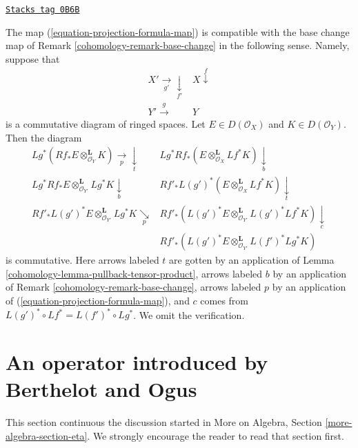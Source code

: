 \begin{remark}
\label{cohomology-remark-compatible-with-diagram}
\href{https://stacks.math.columbia.edu/tag/0B6B}{\texttt{Stacks tag 0B6B}}

The map (\ref{equation-projection-formula-map}) is compatible with the
base change map of Remark \ref{cohomology-remark-base-change} in the following sense.
Namely, suppose that
$$
\begin{array}{cc}X' \underset{g'}{\longrightarrow}\underset{f'}{\downarrow} & X \overset{f}{\downarrow} \\ Y' \overset{g}{\longrightarrow} & Y\end{array}
$$
is a commutative diagram of ringed spaces.
Let $E \in D(\mathcal{O}_X)$ and $K \in D(\mathcal{O}_Y)$.
Then the diagram
$$
\begin{array}{cc}Lg^*(Rf_*E \otimes^\mathbf{L}_{\mathcal{O}_Y} K) \underset{p}{\longrightarrow}\underset{t}{\downarrow} & Lg^*Rf_*(E \otimes^\mathbf{L}_{\mathcal{O}_X} Lf^*K) \underset{b}{\downarrow} \\ Lg^*Rf_*E \otimes^\mathbf{L}_{\mathcal{O}_{Y'}} Lg^*K \underset{b}{\downarrow} & Rf'_*L(g')^*(E \otimes^\mathbf{L}_{\mathcal{O}_X} Lf^*K) \underset{t}{\downarrow} \\ Rf'_*L(g')^*E \otimes^\mathbf{L}_{\mathcal{O}_{Y'}} Lg^*K \underset{p}{\searrow} & Rf'_*(L(g')^*E \otimes^\mathbf{L}_{\mathcal{O}_{Y'}} L(g')^*Lf^*K) \underset{c}{\downarrow} \\  & Rf'_*(L(g')^*E \otimes^\mathbf{L}_{\mathcal{O}_{Y'}} L(f')^*Lg^*K)\end{array}
$$
is commutative. Here arrows labeled $t$ are gotten by an application of
Lemma \ref{cohomology-lemma-pullback-tensor-product}, arrows labeled $b$ by an
application of Remark \ref{cohomology-remark-base-change}, arrows labeled $p$
by an application of (\ref{equation-projection-formula-map}), and
$c$ comes from $L(g')^* \circ Lf^* = L(f')^* \circ Lg^*$.
We omit the verification.
\end{remark}

\section{An operator introduced by Berthelot and Ogus}
\label{cohomology-section-eta}
This section continuous the discussion started in
More on Algebra, Section \ref{more-algebra-section-eta}.
We strongly encourage the reader to read that section first.

